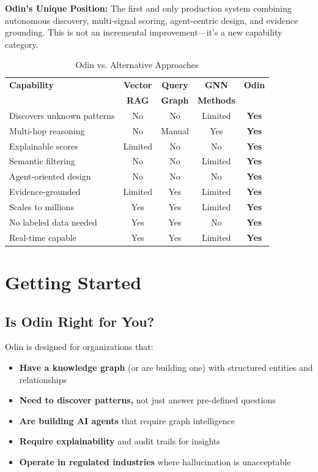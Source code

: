 \documentclass[11pt]{article}
\begin{document}
\textbf{Odin's Unique Position:} The first and only production system combining autonomous discovery, multi-signal scoring, agent-centric design, and evidence grounding. This is not an incremental improvement—it's a new capability category.

\begin{table}[h]
\centering
\caption{Odin vs. Alternative Approaches}
\begin{tabular}{@{}lcccc@{}}
\toprule
\textbf{Capability} & \textbf{Vector} & \textbf{Query} & \textbf{GNN} & \textbf{Odin} \\
 & \textbf{RAG} & \textbf{Graph} & \textbf{Methods} & \\ \midrule
Discovers unknown patterns & No & No & Limited & \textbf{Yes} \\
Multi-hop reasoning & No & Manual & Yes & \textbf{Yes} \\
Explainable scores & Limited & No & No & \textbf{Yes} \\
Semantic filtering & No & No & Limited & \textbf{Yes} \\
Agent-oriented design & No & No & No & \textbf{Yes} \\
Evidence-grounded & Limited & Yes & Limited & \textbf{Yes} \\
Scales to millions & Yes & Yes & Limited & \textbf{Yes} \\
No labeled data needed & Yes & Yes & No & \textbf{Yes} \\
Real-time capable & Yes & Yes & Limited & \textbf{Yes} \\ \bottomrule
\end{tabular}
\end{table}

\section{Getting Started}

\subsection{Is Odin Right for You?}

Odin is designed for organizations that:

\begin{itemize}
\item \textbf{Have a knowledge graph} (or are building one) with structured entities and relationships
\item \textbf{Need to discover patterns,} not just answer pre-defined questions
\item \textbf{Are building AI agents} that require graph intelligence
\item \textbf{Require explainability} and audit trails for insights
\item \textbf{Operate in regulated industries} where hallucination is unacceptable
\end{itemize}
\end{document}
